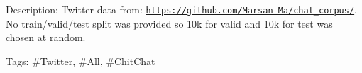 Description\+: Twitter data from\+: \href{https://github.com/Marsan-Ma/chat_corpus/}{\tt https\+://github.\+com/\+Marsan-\/\+Ma/chat\+\_\+corpus/}. No train/valid/test split was provided so 10k for valid and 10k for test was chosen at random.

Tags\+: \#\+Twitter, \#\+All, \#\+Chit\+Chat 